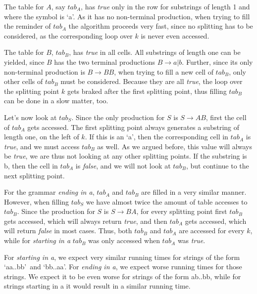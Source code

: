 The table for $A$, say $tab_A$, has \textit{true} only in the row for substrings of length 1 and where the symbol is \lq a\rq.
As it has no non-terminal production, when trying to fill the reminder of $tab_A$ the algorithm proceeds very fast, since no splitting has to be considered, as the corresponding loop over $k$ is never even accessed.

The table for $B$, $tab_B$, has \textit{true} in all cells.
All substrings of length one can be yielded, since $B$ has the two terminal productions $B\rightarrow a|b$.
Further, since its only non-terminal production is $B\rightarrow BB$, when trying to fill a new cell of $tab_B$, only other cells of $tab_B$ must be considered.
Because they are all \textit{true}, the loop over the splitting point $k$ gets braked after the first splitting point, thus filling $tab_B$ can be done in a slow matter, too.

Let's now look at $tab_S$.
Since the only production for $S$ is $S\rightarrow AB$, first the cell of $tab_A$ gets accessed.
The first splitting point always generates a substring of length one, on the left of $k$.
If this is an \lq a\rq, then the corresponding cell in $tab_A$ is \textit{true}, and we must access $tab_B$ as well.
As we argued before, this value will always be \textit{true}, we are thus not looking at any other splitting points.
If the substring is b, then the cell in $tab_A$ is \textit{false}, and we will not look at $tab_B$, but continue to the next splitting point.

For the grammar \textit{ending in a}, $tab_A$ and $tab_B$ are filled in a very similar manner.
However, when filling $tab_S$ we have almost twice the amount of table accesses to $tab_B$.
Since the production for $S$ is $S\rightarrow BA$, for every splitting point first $tab_B$ gets accessed, which will always return \textit{true}, and then $tab_A$ gets accessed, which will return \textit{false} in most cases.
Thus, both $tab_B$ and $tab_A$ are accessed for every $k$, while for \textit{starting in a} $tab_B$ was only accessed when $tab_A$ was \textit{true}.

For \textit{starting in a}, we expect very similar running times for strings of the form \lq aa..bb\rq~and \lq bb..aa\rq.
For \textit{ending in a}, we expect worse running times for those strings.
We expect it to be even worse for strings of the form ab..bb, while for strings starting in a it would result in a similar running time.


